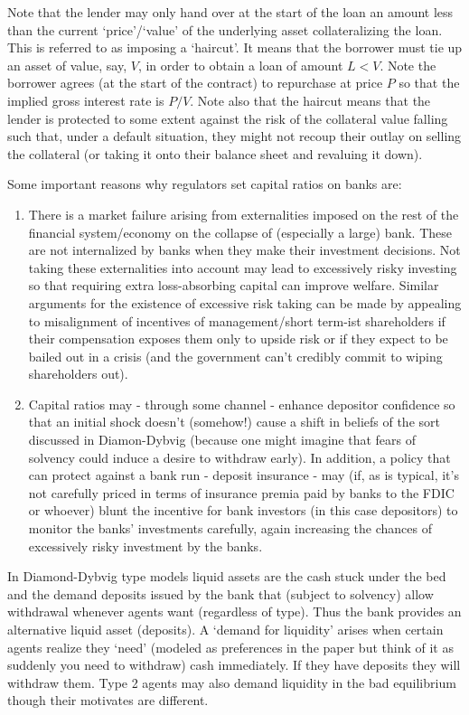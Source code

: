 \documentclass[authoryear,11pt]{elsarticle}
\begin{document}
Note that the lender may only hand over at the start of the loan an amount less than the current `price'/`value' of the underlying asset collateralizing the loan. This is referred to as imposing a `haircut'. It means that the borrower must tie up an asset of value, say, $V$, in order to obtain a loan of amount $L<V$. Note the borrower agrees (at the start of the contract) to repurchase at price $P$ so that the implied gross interest rate is $P/V$. Note also that the haircut means that the lender is protected to some extent against the risk of the collateral value falling such that, under a default situation, they might not recoup their outlay on selling the collateral (or taking it onto their balance sheet and revaluing it down).

Some important reasons why regulators set capital ratios on banks are:
\begin{enumerate}
\item	There is a market failure arising from externalities imposed on the rest of the financial system/economy on the collapse of (especially a large) bank. These are not internalized by banks when they make their investment decisions. Not taking these externalities into account may lead to excessively risky investing so that requiring extra loss-absorbing capital can improve welfare. Similar arguments for the existence of excessive risk taking can be made by appealing to misalignment of incentives of management/short term-ist shareholders if their compensation exposes them only to upside risk or if they expect to be bailed out in a crisis (and the government can't credibly commit to wiping shareholders out).
\item	Capital ratios may - through some channel - enhance depositor confidence so that an initial shock doesn't (somehow!) cause a shift in beliefs of the sort discussed in Diamon-Dybvig (because one might imagine that fears of solvency could induce a desire to withdraw early). In addition, a policy that can protect against a bank run - deposit insurance - may (if, as is typical, it's not carefully priced in terms of insurance premia paid by banks to the FDIC or whoever) blunt the incentive for bank investors (in this case depositors) to monitor the banks' investments carefully, again increasing the chances of excessively risky investment by the banks.
\end{enumerate}

In Diamond-Dybvig type models liquid assets are the cash stuck under the bed and the demand deposits issued by the bank that (subject to solvency) allow withdrawal whenever agents want (regardless of type). Thus the bank provides an alternative liquid asset (deposits). A `demand for liquidity' arises when certain agents realize they `need' (modeled as preferences in the paper but think of it as suddenly you need to withdraw) cash immediately. If they have deposits they will withdraw them. Type 2 agents may also demand liquidity in the bad equilibrium though their motivates are different.
\end{document}

